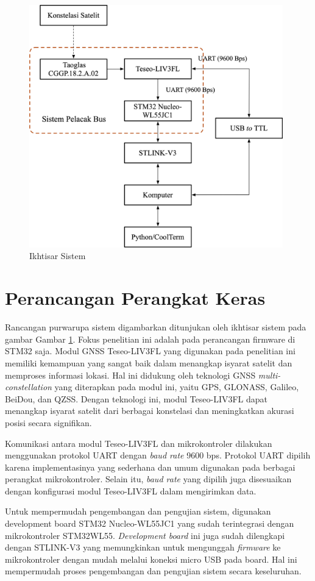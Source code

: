 \begin{figure}[H]
	\centering
	\includegraphics[width=11cm]{contents/chapter-3/system-overview.png}
	\caption{Ikhtisar Sistem}
	\label{Fig: system-overview}
\end{figure}

\section{Perancangan Perangkat Keras}
Rancangan purwarupa sistem digambarkan ditunjukan oleh ikhtisar sistem pada gambar Gambar  \ref{Fig: system-overview}. Fokus penelitian ini adalah pada perancangan firmware di STM32 saja.  Modul GNSS Teseo-LIV3FL yang digunakan pada penelitian ini memiliki kemampuan yang sangat baik dalam menangkap isyarat satelit dan memproses informasi lokasi. Hal ini didukung oleh teknologi GNSS \textit{multi-constellation} yang diterapkan pada modul ini, yaitu GPS, GLONASS, Galileo, BeiDou, dan QZSS. Dengan teknologi ini, modul Teseo-LIV3FL dapat menangkap isyarat satelit dari berbagai konstelasi dan meningkatkan akurasi posisi secara signifikan.

Komunikasi antara modul Teseo-LIV3FL dan mikrokontroler dilakukan menggunakan protokol UART dengan \textit{baud rate} 9600 bps. Protokol UART dipilih karena implementasinya yang sederhana dan umum digunakan pada berbagai perangkat mikrokontroler. Selain itu, \textit{baud rate} yang dipilih juga disesuaikan dengan konfigurasi modul Teseo-LIV3FL dalam mengirimkan data.

Untuk mempermudah pengembangan dan pengujian sistem, digunakan development board STM32 Nucleo-WL55JC1 yang sudah terintegrasi dengan mikrokontroler STM32WL55. \textit{Development board} ini juga sudah dilengkapi dengan STLINK-V3 yang memungkinkan untuk mengunggah \textit{firmware} ke mikrokontroler dengan mudah melalui koneksi micro USB pada board. Hal ini mempermudah proses pengembangan dan pengujian sistem secara keseluruhan.

